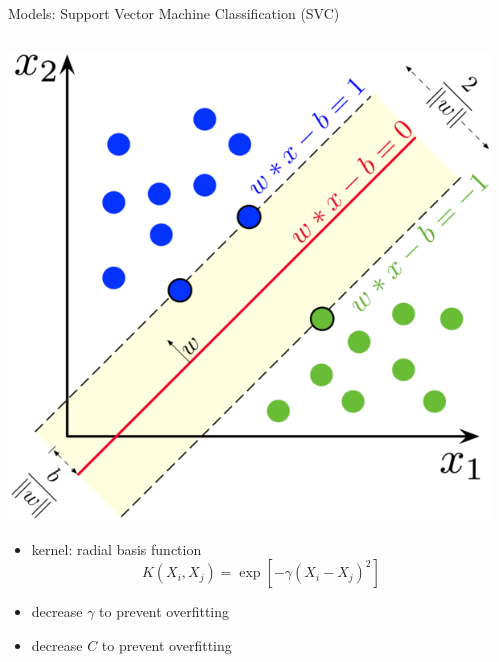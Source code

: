 \documentclass{if-beamer}
\begin{document}
\begin{frame}{Models:  Support Vector Machine Classification (SVC)} 

    \begin{columns}
   \begin{column}{0.5\textwidth} 
   \includegraphics[scale=1]{./figs/svc.png} 
   
   \begin{itemize}
   \item kernel: radial basis function
           \begin{equation}
           	K(X_i, X_j) = \exp[-\gamma  (X_i - X_j)^2]
           \end{equation}
   \item decrease $\gamma$ to prevent overfitting
   \item decrease $C$ to prevent overfitting
   \end{itemize}

   \end{column} 
    
   \begin{column}{0.5\textwidth}
 

\end{column}
\end{columns}
\end{frame}
\end{document}
